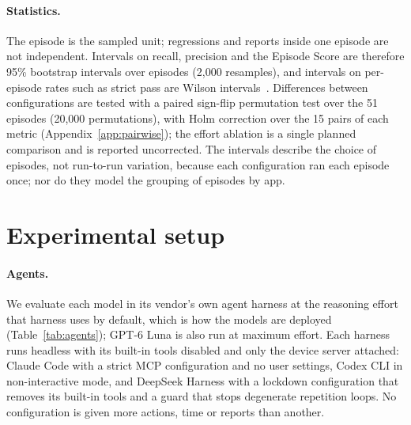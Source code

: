 \documentclass[11pt]{article}
\begin{document}
\paragraph{Statistics.} The episode is the sampled unit; regressions and reports inside one episode
are not independent. Intervals on recall, precision and the Episode Score are therefore 95\%
bootstrap intervals over episodes (2{,}000 resamples), and intervals on per-episode rates such as
strict pass are Wilson intervals~\cite{wilson1927}. Differences between configurations are tested
with a paired sign-flip permutation test over the 51 episodes (20{,}000 permutations), with Holm
correction over the 15 pairs of each metric (Appendix~\ref{app:pairwise}); the effort ablation is a
single planned comparison and is reported uncorrected. The intervals describe the choice of
episodes, not run-to-run variation, because each configuration ran each episode once; nor do they
model the grouping of episodes by app.

\section{Experimental setup}\label{sec:setup}

\paragraph{Agents.} We evaluate each model in its vendor's own agent harness at the reasoning
effort that harness uses by default, which is how the models are deployed
(Table~\ref{tab:agents}); GPT-6 Luna is also run at maximum effort. Each harness runs headless with
its built-in tools disabled and only the device server attached: Claude Code with a strict MCP
configuration and no user settings, Codex CLI in non-interactive mode, and DeepSeek Harness with a
lockdown configuration that removes its built-in tools and a guard that stops degenerate repetition
loops. No configuration is given more actions, time or reports than another.
\end{document}
